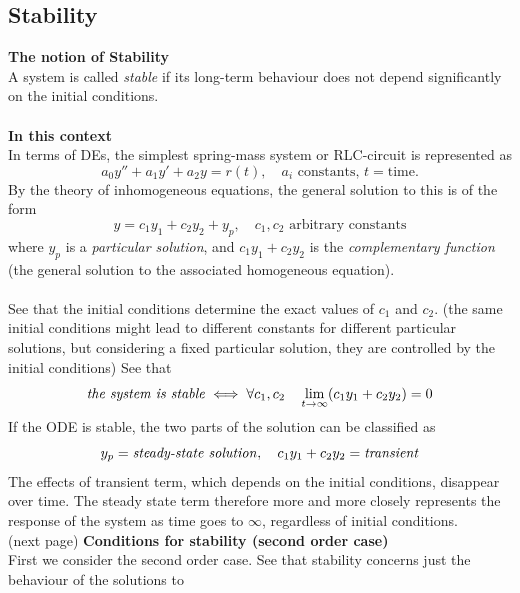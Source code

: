 \documentclass{report}
\begin{document}
\subsection{Stability}
\textbf{The notion of Stability}\\
A system is called \textit{stable} if its long-term behaviour does not depend significantly 
on the initial conditions.\\
\vspace{1mm}\\
\textbf{In this context}\\
In terms of DEs, the simplest spring-mass system or RLC-circuit is represented as
\begin{equation*}
a_0y''+a_1y'+a_2y=r(t),\quad a_i\text{ constants, }t=\text{time.}
\end{equation*}
By the theory of inhomogeneous equations, the general solution to this is of the form
\begin{equation*}
y=c_1y_1+c_2y_2+y_p,\quad\text{$c_1,c_2$ arbitrary constants}
\end{equation*}
where $y_p$ is a \textit{particular solution}, and $c_1y_1+c_2y_2$ is the \textit{complementary function} (the
general solution to the associated homogeneous equation).\\
\vspace{1mm}\\
See that the initial conditions determine the exact values of $c_1$ and $c_2$. (the same initial conditions
might lead to different constants for different particular solutions, but considering a
fixed particular solution, they are controlled by the initial conditions) See that
\begin{equation*}
\text{\textit{the system is stable}}\iff\forall c_1,c_2\quad\lim_{t\to\infty}(c_1y_1+c_2y_2)=0
\end{equation*}
If the ODE is stable, the two parts of the solution can be classified as
\begin{equation*}
y_p=\text{\textit{steady-state solution}},\quad c_1y_1+c_2y_2=\text{\textit{transient}}
\end{equation*}
The effects of transient term, which depends on the initial conditions, disappear over time. 
The steady state term therefore more and more closely represents the response of the system as time goes to $\infty$, regardless of initial conditions.\\
(next page)
\newpage
\noindent\textbf{Conditions for stability (second order case)}\\
First we consider the second order case. See that stability concerns just the behaviour of the solutions to
\end{document}

